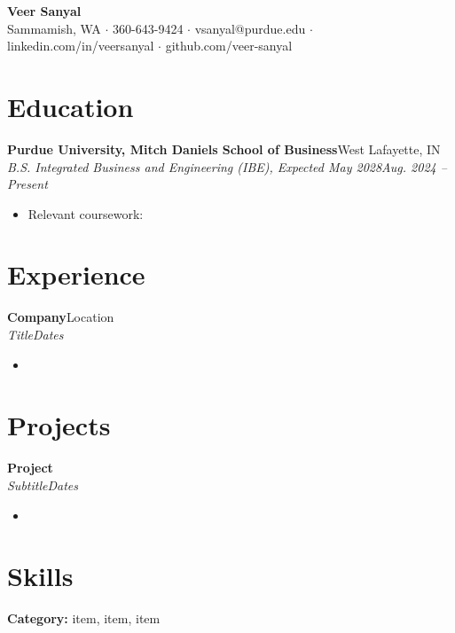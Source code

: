 \documentclass[10pt,letterpaper]{article}
\newcommand{\entry}[4]{%
  \textbf{#1}\hfill #2\\[1pt]
  \textit{#3}\hfill \textit{#4}\\[2pt]
}
\begin{document}
\begin{center}
  {\LARGE \textbf{Veer Sanyal}}\\[3pt]
  Sammamish, WA $\cdot$ 360-643-9424 $\cdot$ vsanyal@purdue.edu $\cdot$ linkedin.com/in/veersanyal $\cdot$ github.com/veer-sanyal
\end{center}

\section*{Education}
\textbf{Purdue University, Mitch Daniels School of Business}\hfill West Lafayette, IN\\[1pt]
\textit{B.S. Integrated Business and Engineering (IBE), Expected May 2028}\hfill \textit{Aug. 2024 -- Present}
\begin{itemize}
  \item Relevant coursework: %
\end{itemize}

\section*{Experience}
\entry{Company}{Location}{Title}{Dates}
\begin{itemize}
  \item %
\end{itemize}

\section*{Projects}
\entry{Project}{}{Subtitle}{Dates}
\begin{itemize}
  \item %
\end{itemize}

\section*{Skills}
\textbf{Category:} item, item, item
\end{document}
